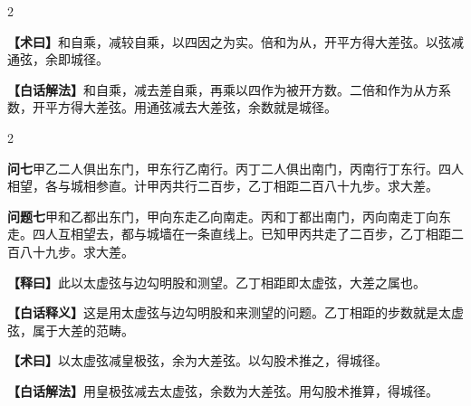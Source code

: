 \documentclass[11pt,a4paper]{article}
\newcommand{\WenQuestion}[1]{\textbf{\textcolor{classicalcolor}{#1}}}
\newcommand{\BaiQuestion}[1]{\textbf{\textcolor{moderncolor}{#1}}}
\newcommand{\WenExplain}{\textcolor{classicalcolor}{\textbf{【释曰】}}}
\newcommand{\BaiExplain}{\textcolor{moderncolor}{\textbf{【白话释义】}}}
\newcommand{\WenMethod}{\textcolor{classicalcolor}{\textbf{【术曰】}}}
\newcommand{\BaiMethod}{\textcolor{moderncolor}{\textbf{【白话解法】}}}
\begin{document}
\begin{paracol}{2}
\switchcolumn*
\begin{tcolorbox}[colback=red!5,colframe=red!40!black,boxrule=0.3pt]
\WenMethod\quad 和自乘，减较自乘，以四因之为实。倍和为从，开平方得大差弦。以弦减通弦，余即城径。
\end{tcolorbox}
\switchcolumn
\begin{tcolorbox}[colback=blue!5,colframe=blue!40!black,boxrule=0.3pt]
\BaiMethod\quad 和自乘，减去差自乘，再乘以四作为被开方数。二倍和作为从方系数，开平方得大差弦。用通弦减去大差弦，余数就是城径。
\end{tcolorbox}

\end{paracol}

\vspace{0.5em}

\begin{paracol}{2}

\switchcolumn*
\begin{tcolorbox}[colback=red!3,colframe=red!30!black,boxrule=0.3pt]
\WenQuestion{问七}\quad 甲乙二人俱出东门，甲东行乙南行。丙丁二人俱出南门，丙南行丁东行。四人相望，各与城相参直。计甲丙共行二百步，乙丁相距二百八十九步。求大差。
\end{tcolorbox}
\switchcolumn
\begin{tcolorbox}[colback=blue!3,colframe=blue!30!black,boxrule=0.3pt]
\BaiQuestion{问题七}\quad 甲和乙都出东门，甲向东走乙向南走。丙和丁都出南门，丙向南走丁向东走。四人互相望去，都与城墙在一条直线上。已知甲丙共走了二百步，乙丁相距二百八十九步。求大差。
\end{tcolorbox}

\switchcolumn*
\begin{tcolorbox}[colback=red!5,colframe=red!30!black,boxrule=0.3pt]
\WenExplain\quad 此以太虚弦与边勾明股和测望。乙丁相距即太虚弦，大差之属也。
\end{tcolorbox}
\switchcolumn
\begin{tcolorbox}[colback=blue!5,colframe=blue!30!black,boxrule=0.3pt]
\BaiExplain\quad 这是用太虚弦与边勾明股和来测望的问题。乙丁相距的步数就是太虚弦，属于大差的范畴。
\end{tcolorbox}

\switchcolumn*
\begin{tcolorbox}[colback=red!5,colframe=red!40!black,boxrule=0.3pt]
\WenMethod\quad 以太虚弦减皇极弦，余为大差弦。以勾股术推之，得城径。
\end{tcolorbox}
\switchcolumn
\begin{tcolorbox}[colback=blue!5,colframe=blue!40!black,boxrule=0.3pt]
\BaiMethod\quad 用皇极弦减去太虚弦，余数为大差弦。用勾股术推算，得城径。
\end{tcolorbox}


\end{paracol}
\end{document}
